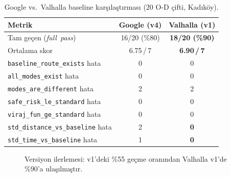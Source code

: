 \documentclass[11pt,a4paper]{article}
\theoremstyle{definition}
\begin{document}
\begin{table}[H]
\centering
\caption{Google vs.\ Valhalla baseline kar\c{s}{\i}la\c{s}t{\i}rmas{\i}
         (20 O-D \c{c}ifti, Kad{\i}k\"oy).}
\label{tab:bench-summary}
\renewcommand{\arraystretch}{1.25}
\begin{tabular}{lcc}
\toprule
\textbf{Metrik} & \textbf{Google (v4)} & \textbf{Valhalla (v1)} \\
\midrule
\rowcolor{passbg}
Tam ge\c{c}en (\emph{full~pass}) & 16/20 (\%80) & \textbf{18/20 (\%90)} \\
Ortalama skor & 6.75\,/\,7 & \textbf{6.90\,/\,7} \\
\midrule
\texttt{baseline\_route\_exists} hata & 0 & 0 \\
\texttt{all\_modes\_exist} hata        & 0 & 0 \\
\rowcolor{failbg}
\texttt{modes\_are\_different} hata    & 2 & 2 \\
\texttt{safe\_risk\_le\_standard} hata & 0 & 0 \\
\texttt{viraj\_fun\_ge\_standard} hata & 0 & 0 \\
\rowcolor{passbg}
\texttt{std\_distance\_vs\_baseline} hata & 2 & \textbf{0} \\
\texttt{std\_time\_vs\_baseline} hata     & 1 & \textbf{0} \\
\bottomrule
\end{tabular}
\end{table}



\begin{figure}[H]
\centering
{}
\caption{Versiyon ilerlemesi: v1'deki \%55 ge\c{c}me oran{\i}ndan
         Valhalla v1'de \%90'a ula\c{s}{\i}lm{\i}\c{s}t{\i}r.}
\label{fig:version-bar}
\end{figure}
\end{document}
